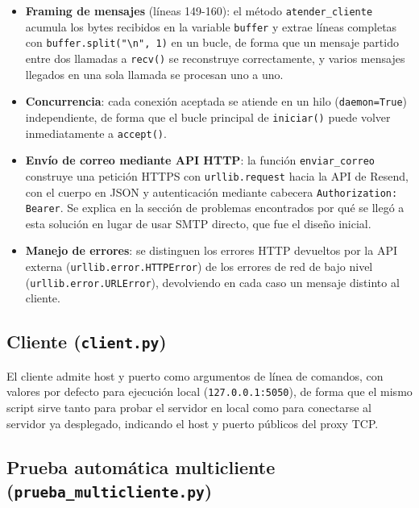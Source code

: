 \documentclass[12pt,a4paper]{article}
\begin{document}
\begin{itemize}
    \item \textbf{Framing de mensajes} (líneas 149-160): el método \texttt{atender\_cliente} acumula los bytes recibidos en la variable \texttt{buffer} y extrae líneas completas con \texttt{buffer.split("\textbackslash n", 1)} en un bucle, de forma que un mensaje partido entre dos llamadas a \texttt{recv()} se reconstruye correctamente, y varios mensajes llegados en una sola llamada se procesan uno a uno.
    \item \textbf{Concurrencia}: cada conexión aceptada se atiende en un hilo (\texttt{daemon=True}) independiente, de forma que el bucle principal de \texttt{iniciar()} puede volver inmediatamente a \texttt{accept()}.
    \item \textbf{Envío de correo mediante API HTTP}: la función \texttt{enviar\_correo} construye una petición HTTPS con \texttt{urllib.request} hacia la API de Resend, con el cuerpo en JSON y autenticación mediante cabecera \texttt{Authorization: Bearer}. Se explica en la sección de problemas encontrados por qué se llegó a esta solución en lugar de usar SMTP directo, que fue el diseño inicial.
    \item \textbf{Manejo de errores}: se distinguen los errores HTTP devueltos por la API externa (\texttt{urllib.error.HTTPError}) de los errores de red de bajo nivel (\texttt{urllib.error.URLError}), devolviendo en cada caso un mensaje distinto al cliente.
\end{itemize}

\subsection{Cliente (\texttt{client.py})}



El cliente admite host y puerto como argumentos de línea de comandos, con valores por defecto para ejecución local (\texttt{127.0.0.1:5050}), de forma que el mismo script sirve tanto para probar el servidor en local como para conectarse al servidor ya desplegado, indicando el host y puerto públicos del proxy TCP.

\subsection{Prueba automática multicliente (\texttt{prueba\_multicliente.py})}
\end{document}
